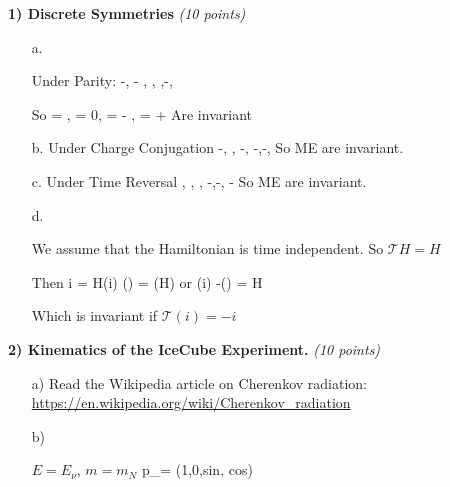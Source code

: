{\large

\textbf{1) Discrete Symmetries } \hfill \textit{(10 points)}\\

\begin{itemize}
\item[a.]{ Under Parity:
\be
  \rightarrow -, \vec{\triangledown} \rightarrow - \vec{\triangledown}, \rho \rightarrow \rho,  \rightarrow{},\rightarrow-,  \rightarrow {}
\ee

So 
\be
 \vec{\triangledown} \cdot {} = \rho,  \vec{\triangledown} \cdot {} = 0,   \vec{\triangledown} \times {} = - ,  \vec{\triangledown} \times {} =  + 
\ee
Are invariant
}
\item[b.]{ Under Charge Conjugation
\be
  \rightarrow -, \vec{\triangledown} \rightarrow \vec{\triangledown}, \rho \rightarrow -\rho,  \rightarrow -,\rightarrow-,  \rightarrow {}
\ee
So ME are invariant.
}
\item[c.]{ Under Time Reversal
\be
  \rightarrow {}, \vec{\triangledown} \rightarrow \vec{\triangledown}, \rho \rightarrow \rho,  \rightarrow -,\rightarrow-,  \rightarrow -
\ee
So ME are invariant.
}
\item[d.]{ 
We assume that the Hamiltonian is time independent.  So $\mathcal{T}H = H$

Then
\be
i \psi = H\psi   \rightarrow {}(i) ()  \psi = (H)\psi
\ee
or
\be
 (i) -()  \psi = H\psi
\ee

Which is invariant if $\mathcal{T}(i) = -i$
}
\end{itemize}

\vspace*{0.25in}


\textbf{2) Kinematics of the IceCube Experiment. } \hfill \textit{(10 points)}\\

\begin{itemize}
\item[a)]{Read the Wikipedia article on Cherenkov radiation:  \href{https://en.wikipedia.org/wiki/Cherenkov_radiation}{https://en.wikipedia.org/wiki/Cherenkov\_radiation}}
\item[b)]{
$E = E_{\nu}$, $m = m_N$ 
\be
p_\mu = (1,0,sin\theta, cos\theta)
\ee

}
\end{itemize}}
